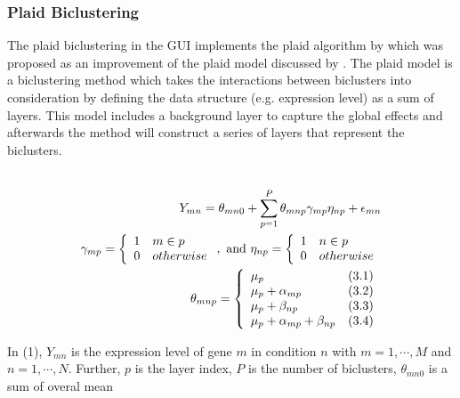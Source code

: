 \documentclass[a4paper]{article}\usepackage[]{graphicx}\usepackage[]{color}
\begin{document}
\subsubsection{Plaid Biclustering}
The plaid biclustering in the GUI implements the plaid algorithm by
\citet{Turner2005} which was proposed as an improvement of the plaid model
discussed by \citet{Lazzeroni2000}. The plaid model is a biclustering method
which takes the interactions between biclusters into consideration by defining
the data structure (e.g. expression level) as a sum of layers. This model
includes a background layer to capture the global effects and afterwards the
method will construct a series of layers that represent the biclusters.
\\ \\
\begin{center}
\begin{align}
\displaystyle Y_{mn} = \theta_{mn0}+
\sum_{p=1}^{P}\theta_{mnp}\gamma_{mp}\eta_{np}+\epsilon_{mn} \\
\vspace{0.3cm}
\gamma_{mp}=\left\{ \begin{array}{ll}  
                     1 & m \in p \\
                     0 & otherwise
                     \end{array}
            \right.
,\text{ and }
\eta_{np}=\left\{ \begin{array}{ll}  
                     1 & n \in p \\
                     0 & otherwise
                     \end{array}
            \right. 
            \\
\vspace{0.3cm}
\theta_{mnp}=\left\{ \begin{array}{ll}
    \mu_p&\text{(3.1)}\\\mu_p+\alpha_{mp}&\text{(3.2)}\\\mu_p+\beta_{np}&\text{(3.3)}\\\mu_p+\alpha_{mp}+\beta_{np}&\text{(3.4)}
\end{array} \right.
\end{align}
\end{center}
\noindent In (1), $Y_{mn}$ is the expression level of gene $m$ in
condition $n$ with $m=1,\cdots,M$ and $n=1,\cdots,N$. Further, $p$ is the layer
index, $P$ is the number of biclusters, $\theta_{mn0}$ is a sum of overal mean
\end{document}
